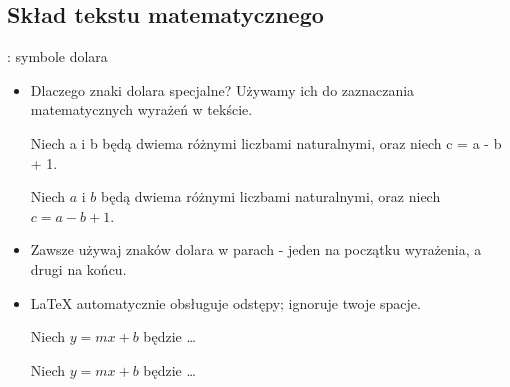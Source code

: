\documentclass{beamer}
\begin{document}
\subsection{Skład tekstu matematycznego}
\begin{frame}[fragile]{\insertsubsection{}: symbole dolara}
\begin{itemize}
\item Dlaczego znaki dolara \keystrokebftt{\$} specjalne? Używamy ich do zaznaczania
matematycznych wyrażeń w tekście.\\[1ex]
\begin{exampletwouptiny}
Niech a i b będą dwiema różnymi 
liczbami naturalnymi, oraz niech c = a - b + 1.

Niech $a$ i $b$ będą dwiema różnymi 
liczbami naturalnymi, oraz niech $c = a - b + 1$.
\end{exampletwouptiny}
\item Zawsze używaj znaków dolara w parach - jeden na początku wyrażenia, a drugi
na końcu.
\item \LaTeX{} automatycznie obsługuje odstępy; ignoruje twoje spacje.
\begin{exampletwouptiny}
Niech $y=mx+b$ będzie \ldots

Niech $y = m x + b$ będzie \ldots
\end{exampletwouptiny}
\end{itemize}
\end{frame}
\end{document}
